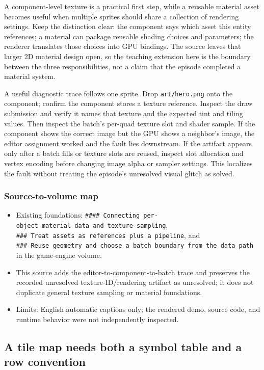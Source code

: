 A component-level texture is a practical first step, while a reusable material asset becomes useful when multiple sprites should share a collection of rendering settings. Keep the distinction clear: the component says which asset this entity references; a material can package reusable shading choices and parameters; the renderer translates those choices into GPU bindings. The source leaves that larger 2D material design open, so the teaching extension here is the boundary between the three responsibilities, not a claim that the episode completed a material system.

A useful diagnostic trace follows one sprite. Drop \texttt{art/hero.png} onto the component; confirm the component stores a texture reference. Inspect the draw submission and verify it names that texture and the expected tint and tiling values. Then inspect the batch's per-quad texture slot and shader sample. If the component shows the correct image but the GPU shows a neighbor's image, the editor assignment worked and the fault lies downstream. If the artifact appears only after a batch fills or texture slots are reused, inspect slot allocation and vertex encoding before changing image alpha or sampler settings. This localizes the fault without treating the episode's unresolved visual glitch as solved.

\subsubsection{Source-to-volume map}\label{06-engine-ii-ch026-source-to-volume-map-1}

\begin{itemize}
\tightlist
\item
  Existing foundations: \texttt{\#\#\#\#\ Connecting\ per-object\ material\ data\ and\ texture\ sampling}, \texttt{\#\#\#\ Treat\ assets\ as\ references\ plus\ a\ pipeline}, and \texttt{\#\#\#\ Reuse\ geometry\ and\ choose\ a\ batch\ boundary\ from\ the\ data\ path} in the game-engine volume.
\item
  This source adds the editor-to-component-to-batch trace and preserves the recorded unresolved texture-ID/rendering artifact as unresolved; it does not duplicate general texture sampling or material foundations.
\item
  Limits: English automatic captions only; the rendered demo, source code, and runtime behavior were not independently inspected.
\end{itemize}

\subsection{A tile map needs both a symbol table and a row convention}\label{06-engine-ii-ch026-a-tile-map-needs-both-a-symbol-table-and-a-row-convention}

